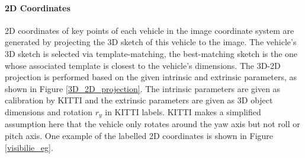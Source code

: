 \documentclass[a4paper,12pt]{article}
\begin{document}
\renewcommand{\arraystretch}{1.2}
\begin{table}[h]
	\centering
	\caption{Specification of three additional labels}
	\label{new_label}
\end{table}


\paragraph{2D Coordinates}

2D coordinates of key points of each vehicle in the image coordinate system are generated by projecting the 3D sketch of this vehicle to the image. The vehicle's 3D sketch is selected via template-matching, \ie the best-matching sketch is the one whose associated template is closest to the vehicle's dimensions. The 3D-2D projection is performed based on the given intrinsic and extrinsic parameters, as shown in Figure \ref{3D_2D_projection}. The intrinsic parameters are given as calibration by KITTI and the extrinsic parameters are given as 3D object dimensions and rotation $r_y$ in KITTI labels. KITTI makes a simplified assumption here that the vehicle only rotates around the yaw axis but not roll or pitch axis. One example of the labelled 2D coordinates is shown in Figure \ref{visibilie_eg}.
\end{document}
